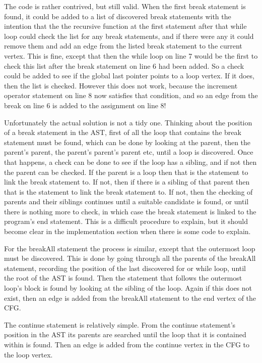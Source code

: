 

The code is rather contrived, but still valid. When the first break statement is found, it could be added to a list of discovered break statements with the intention that the the recursive function at the first statement after that while loop could check the list for any break statements, and if there were any it could remove them and add an edge from the listed break statement to the current vertex. This is fine, except that then the while loop on line 7 would be the first to check this list after the break statement on line 6 had been added. So a check could be added to see if the global last pointer points to a loop vertex. If it does, then the list is checked. However this does not work, because the increment operator statement on line 8 now satisfies that condition, and so an edge from the break on line 6 is added to the assignment on line 8! 

Unfortunately the actual solution is not a tidy one. Thinking about the position of a break statement in the AST, first of all the loop that contains the break statement must be found, which can be done by looking at the parent, then the parent's parent, the parent's parent's parent etc, until a loop is discovered. Once that happens, a check can be done to see if the loop has a sibling, and if not then the parent can be checked. If the parent is a loop then that is the statement to link the break statement to. If not, then if there is a sibling of that parent then that is the statement to link the break statement to. If not, then the checking of parents and their siblings continues until a suitable candidate is found, or until there is nothing more to check, in which case the break statement is linked to the program's end statement. This is a difficult procedure to explain, but it should become clear in the implementation section when there is some code to explain.

For the breakAll statement the process is similar, except that the outermost loop must be discovered. This is done by going through all the parents of the breakAll statement, recording the position of the last discovered for or while loop, until the root of the AST is found. Then the statement that follows the outermost loop's block is found by looking at the sibling of the loop. Again if this does not exist, then an edge is added from the breakAll statement to the end vertex of the CFG.

The continue statement is relatively simple. From the continue statement's position in the AST its parents are searched until the loop that it is contained within is found. Then an edge is added from the continue vertex in the CFG to the loop vertex. 

